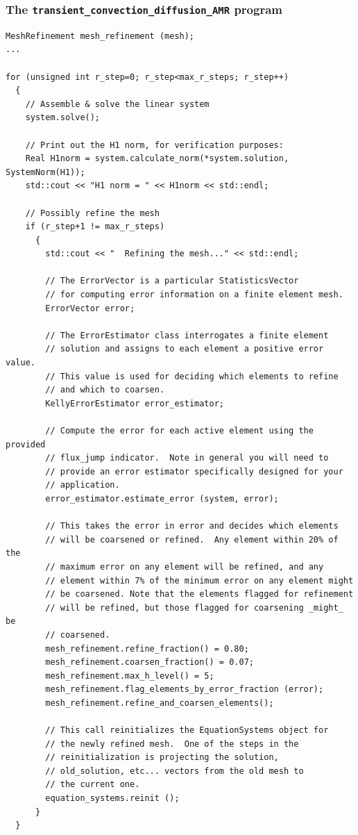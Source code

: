 \frame
{
  \Large
  \begin{block}{}
  \end{block}
}

\begin{frame}
  \frametitle{The \texttt{transient\_convection\_diffusion\_AMR} program}
    \begin{lstlisting}
MeshRefinement mesh_refinement (mesh);
...

for (unsigned int r_step=0; r_step<max_r_steps; r_step++)
  {
    // Assemble & solve the linear system
    system.solve();

    // Print out the H1 norm, for verification purposes:
    Real H1norm = system.calculate_norm(*system.solution, SystemNorm(H1));
    std::cout << "H1 norm = " << H1norm << std::endl;

    // Possibly refine the mesh
    if (r_step+1 != max_r_steps)
      {
        std::cout << "  Refining the mesh..." << std::endl;

        // The ErrorVector is a particular StatisticsVector
        // for computing error information on a finite element mesh.
        ErrorVector error;

        // The ErrorEstimator class interrogates a finite element
        // solution and assigns to each element a positive error value.
        // This value is used for deciding which elements to refine
        // and which to coarsen.
        KellyErrorEstimator error_estimator;

        // Compute the error for each active element using the provided
        // flux_jump indicator.  Note in general you will need to
        // provide an error estimator specifically designed for your
        // application.
        error_estimator.estimate_error (system, error);

        // This takes the error in error and decides which elements
        // will be coarsened or refined.  Any element within 20% of the
        // maximum error on any element will be refined, and any
        // element within 7% of the minimum error on any element might
        // be coarsened. Note that the elements flagged for refinement
        // will be refined, but those flagged for coarsening _might_ be
        // coarsened.
        mesh_refinement.refine_fraction() = 0.80;
        mesh_refinement.coarsen_fraction() = 0.07;
        mesh_refinement.max_h_level() = 5;
        mesh_refinement.flag_elements_by_error_fraction (error);
        mesh_refinement.refine_and_coarsen_elements();

        // This call reinitializes the EquationSystems object for
        // the newly refined mesh.  One of the steps in the
        // reinitialization is projecting the solution,
        // old_solution, etc... vectors from the old mesh to
        // the current one.
        equation_systems.reinit ();
      }
  }
    \end{lstlisting}
\end{frame}
    
